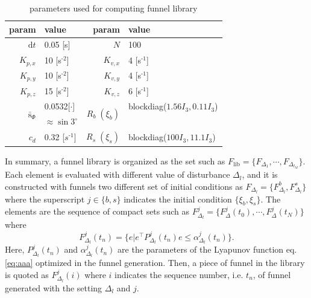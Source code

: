 \documentclass[letterpaper, 10 pt, conference]{ieeeconf}  %
\begin{document}
\begin{table}[b]
\begin{center}
\begin{tabular}{|r|l||r|l|} 
\hline
param & value & param & value \\ \hline \hline
$\text{d}t$ & 0.05 [s] & $N$ & 100 \\ \hline
$K_{p,x}$ & 10 [s$^\text{-2}$] & $K_{v,x}$ & 4 [s$^\text{-1}$] \\ \hline
$K_{p,y}$ & 10 [s$^\text{-2}$] & $K_{v,y}$ & 4 [s$^\text{-1}$] \\ \hline
$K_{p,z}$ & 15 [s$^\text{-2}$] & $K_{v,z}$ & 6 [s$^\text{-1}$] \\ \hline
\multirow{2}{*}{$\bar{\text{s}}_\Phi$} & 0.0532[$\cdot$] & \multirow{2}{*}{$R_b\;(\xi_b)$} & blockdiag($1.56I_3,0.11I_3$) \\ 
& $\approx\sin3^\circ$ & & \;\;\;\;\;\;\;\;\;\;\;\;\;\;\;\;\; \\ \hline
$c_d$ & 0.32 [$s^\text{-1}$]                         & $R_s\;(\xi_s)$ & blockdiag($100I_3,11.1I_3$) \\ \hline
\end{tabular}
\caption{parameters used for computing funnel library} \label{table:settings} 
\end{center}
\end{table}

In summary, a funnel library is organized as the set such as ${F}_{\text{lib}} = \{F_{\Delta_1},\cdots,F_{\Delta_{l_M}}\}$.
Each element is evaluated with different value of disturbance $\Delta_l$, 
and it is constructed with funnels two different set of initial conditions as $F_{\Delta_l} = \{F_{\Delta_l}^b,F_{\Delta_l}^s\}$ where the superscript $j \in \{b,s\}$ indicates the initial condition $\{\xi_b,\xi_s\}$. The elements are the sequence of compact sets such as $F_{\Delta_l}^j = \{F_{\Delta}^j(t_0),\cdots,F_{\Delta}^j(t_N)\}$ where
\begin{equation}
F_{\Delta_l}^j(t_n) = \{e| e^\top P_{\Delta_l}^j(t_n) e \leq  \alpha_{\Delta_l}^j(t_n)\}. \label{eq:discreteFunnel}
\end{equation}
Here, $P_{\Delta_l}^j(t_n)$ and $\alpha_{\Delta_l}^j(t_n)$ are the parameters of the Lyapunov function eq. \eqref{eq:aaa} optimized in the funnel generation.
Then, a piece of funnel in the library is quoted as $F_{\Delta_l}^j(i)$ where $i$ indicates the sequence number, i.e. $t_n$, of funnel generated with the setting $\Delta_l$ and $j$.
\end{document}
